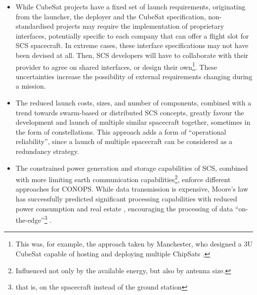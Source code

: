 \documentclass[a4paper,nobib,justified,final]{tufte-book}
\begin{document}
\begin{itemize}
	\item While CubeSat projects have a fixed set of launch requirements, originating from the launcher, the deployer and the CubeSat specification, non-standardised projects may require the implementation of proprietary interfaces, potentially specific to each company that can offer a flight slot for \acs{SCS} spacecraft. In extreme cases, these interface specifications may not have been devised at all. Then, \acs{SCS} developers will have to collaborate with their provider to agree on shared interfaces, or design their own\footnote{This was, for example, the approach taken by Manchester, who designed a 3U CubeSat capable of hosting and deploying multiple ChipSats \cite{manchesterCentimeterScaleSpacecraftDesign2015}.}. These uncertainties increase the possibility of external requirements changing during a mission.
	
	\item The reduced launch costs, sizes, and number of components, combined with a trend towards swarm-based or distributed \acs{SCS} concepts, greatly favour the development and launch of multiple similar spacecraft together, sometimes in the form of constellations. This approach adds a form of ``operational reliability'', since a launch of multiple spacecraft can be considered as a redundancy strategy.
	
	\item The constrained power generation and storage capabilities of \acs{SCS}, combined with more limiting earth communication capabilities\footnote{Influenced not only by the available energy, but also by antenna size.}, enforce different approaches for \acf{CONOPS}. While data transmission is expensive, Moore's law has successfully predicted significant processing capabilities with reduced power consumption and real estate \autocite{mackFiftyYearsMoores2011}, encouraging the processing of data ``on-the-edge''\footnote{that is, on the spacecraft instead of the ground station} \autocite{moreiraEdgeComputingSpace2025}.
\end{itemize}
\end{document}
